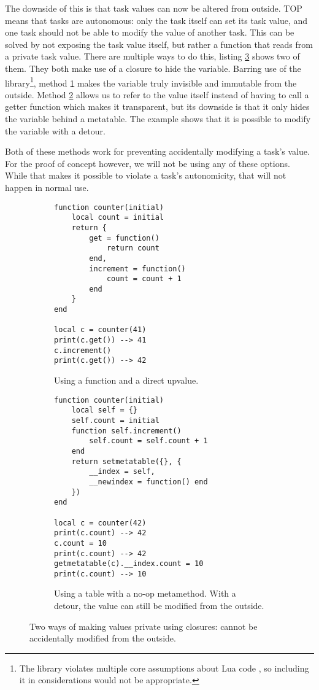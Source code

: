 The downside of this is that task values can now be altered from outside. TOP means that tasks are autonomous: only the task itself can set its task value, and one task should not be able to modify the value of another task. This can be solved by not exposing the task value itself, but rather a function that reads from a private task value. There are multiple ways to do this, listing \ref{lst:lua_private} shows two of them. They both make use of a closure to hide the variable. Barring use of the  library\footnote{The  library violates multiple core assumptions about Lua code \cite{luareferencemanual}, so including it in considerations would not be appropriate.}, method \ref{lst:lua_private_a} makes the  variable truly invisible and immutable from the outside. Method \ref{lst:lua_private_b} allows us to refer to the value itself instead of having to call a getter function which makes it transparent, but its downside is that it only hides the  variable behind a metatable. The example shows that it is possible to modify the variable with a detour.

Both of these methods work for preventing accidentally modifying a task's value. For the proof of concept however, we will not be using any of these options. While that makes it possible to violate a task's autonomicity, that will not happen in normal use.

\begin{figure}[ht]
\centering
\begin{subfigure}{0.40\textwidth}
\begin{verbatim}
function counter(initial)
    local count = initial
    return {
        get = function()
            return count
        end,
        increment = function()
            count = count + 1
        end
    }
end

local c = counter(41)
print(c.get()) --> 41
c.increment()
print(c.get()) --> 42
\end{verbatim}
\caption{Using a  function and a direct  upvalue.}
\label{lst:lua_private_a}
\end{subfigure}
\hspace{0.09\textwidth}
\begin{subfigure}{0.40\textwidth}
\begin{verbatim}
function counter(initial)
    local self = {}
    self.count = initial
    function self.increment()
        self.count = self.count + 1
    end
    return setmetatable({}, {
        __index = self,
        __newindex = function() end
    })
end

local c = counter(42)
print(c.count) --> 42
c.count = 10
print(c.count) --> 42
getmetatable(c).__index.count = 10
print(c.count) --> 10
\end{verbatim}
\caption{Using a table with a no-op  metamethod. With a detour, the value can still be modified from the outside.}
\label{lst:lua_private_b}
\end{subfigure}
\caption{Two ways of making values private using closures:  cannot be accidentally modified from the outside.}
\label{lst:lua_private}
\end{figure}

